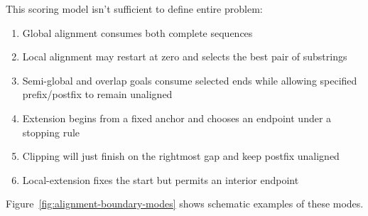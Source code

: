 This scoring model isn't sufficient to define entire problem:
\begin{enumerate}
\item Global alignment consumes both complete sequences
\cite{needleman_wunsch_1970}
\item Local alignment may restart at zero and selects
the best pair of substrings \cite{smith_waterman_1981}
\item Semi-global and overlap
goals consume selected ends while allowing specified prefix/postfix to remain
unaligned
\item Extension begins from a fixed anchor and chooses an endpoint under
a stopping rule
\item Clipping will just finish on the rightmost gap and keep postfix unaligned
\item Local-extension fixes the start but permits an interior endpoint
\end{enumerate}

Figure~\ref{fig:alignment-boundary-modes} shows schematic
examples of these modes.


